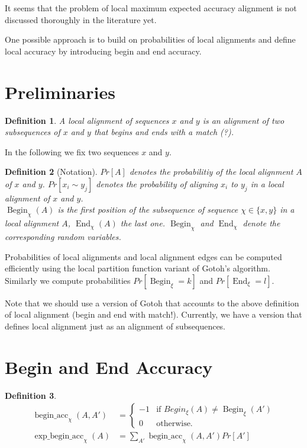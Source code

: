 \documentclass{article}
\newtheorem{definition}{Definition}
\newcommand{\Begin}{\operatorname{Begin}}
\newcommand{\End}{\operatorname{End}}
\newcommand{\accbegin}{\operatorname{begin\_acc}}
\newcommand{\expbeginacc}{\operatorname{exp\_begin\_acc}}
\begin{document}
It seems that the problem of local maximum expected accuracy alignment is not
discussed thoroughly in the literature yet.

One possible approach is to build on probabilities of local alignments and
define local accuracy by introducing begin and end accuracy.

\section{Preliminaries}

\begin{definition}
  A \emph{local alignment} of sequences $x$ and $y$ is an alignment of two
  subsequences of $x$ and $y$ that begins and ends with a match (?).
\end{definition}

In the following we fix two sequences $x$ and $y$.
\begin{definition}[Notation]
  $Pr[A]$ denotes the probabilitiy of the local alignment $A$ of $x$ and $y$.
  $Pr[x_i\sim y_j]$ denotes the probability of aligning $x_i$ to $y_j$ in a
  local alignment of $x$ and $y$.
  \\
  $\Begin_\chi(A)$ is the first position of the subsequence of sequence
  $\chi\in\{x,y\}$ in a local alignment $A$, $\End_\chi(A)$ the last one.
  $\Begin_\chi$ and $\End_\chi$ denote the corresponding random variables.
\end{definition}

Probabilities of local alignments and local alignment edges can be computed
efficiently using the local partition function variant of Gotoh's algorithm.
Similarly we compute probabilities $Pr[\Begin_\xi=k]$ and $Pr[\End_\xi=l]$.

Note that we should use a version of Gotoh that accounts to the above
definition of local alignment (begin and end with match!). Currently, we have a
version that defines local alignment just as an alignment of subsequences.

\section{Begin and End Accuracy}
\label{sec:beg-end-acc}

\begin{definition}
  \begin{align*}
    \accbegin_\chi(A,A') &= 
    \begin{cases}
      -1 & \text{if $Begin_\xi(A)\neq \Begin_\xi(A')$}\\
      0 & \text{otherwise.}
    \end{cases}
    \\
    \expbeginacc_\chi(A) & = \sum_{A'} \accbegin_\chi(A,A') Pr[A']\\
  \end{align*}
\end{definition}
\end{document}

